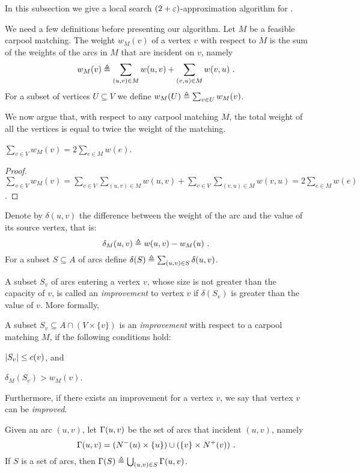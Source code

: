 
In this subsection we give a local search $(2+\varepsilon)$-approximation
algorithm for \carpool.

We need a few definitions before presenting our algorithm.
%
Let $M$ be a feasible carpool matching.  The weight $w_M(v)$ of a
vertex $v$ with respect to $M$ is the sum of the weights of the arcs
in $M$ that are incident on $v$, namely
\[
w_M(v) \triangleq \sum_{(u, v) \in M} w(u, v) + \sum_{(v, u) \in M} w(v, u)
~.
\]
For a subset of vertices $U \subseteq V$ we define
$w_M(U) \triangleq \sum_{v \in U} w_M(v)$.

We now argue that, with respect to any carpool matching $M$, the total
weight of all the vertices is equal to twice the weight of the matching.

\begin{observation}
\label{lm:val-twice}
$\sum_{v \in V} w_M(v) = 2 \sum_{e \in M} w(e)$.
\end{observation}
\begin{proof}
\(
\sum_{v \in V} w_M(v)
= \sum_{v \in V} \sum_{(u, v) \in M} w(u, v) +
    \sum_{v \in V} \sum_{(v, u) \in M} w(v, u) 
= 2 \sum_{e \in M} w(e)
\).
\end{proof}

Denote by $\delta(u,v)$ the difference between the weight of the arc
and the value of its source vertex, that is:
\[
\delta_M(u, v) \triangleq w(u, v) - w_M(u)
~.
\]
For a subset $S \subseteq A$ of arcs define
$\delta(S) \triangleq \sum_{(u,v) \in S} \delta(u,v)$.

A subset $S_v$ of arcs entering a vertex $v$, whose size is not
greater than the capacity of $v$, is called an \emph{improvement} to
vertex $v$ if $\delta(S_v)$ is greater than the value of $v$.  More
formally, 

\begin{definition}
A subset $S_v \subseteq A \cap (V \times \{v\})$ is
an \emph{improvement} with respect to a carpool matching $M$, if the
following conditions hold:%
\begin{inparaenum}[(i)]
\item $\left| S_v \right| \leq c(v)$, and
\item $\delta_M(S_v) > w_M(v)$.
\end{inparaenum}
Furthermore, if there exists an improvement for a vertex $v$, we say
that vertex $v$ can be \emph{improved}.
\end{definition}

Given an arc $(u,v)$, let $\Gamma(u,v)$ be the set of arcs that incident
$(u, v)$, namely
\[
\Gamma(u,v) = (N^-(u) \times \{u\}) \cup (\{v\} \times N^+(v))
~.
\]
If $S$ is a set of arcs, then $\Gamma(S) \triangleq \bigcup_{(u,v) \in
S} \Gamma(u,v)$.


